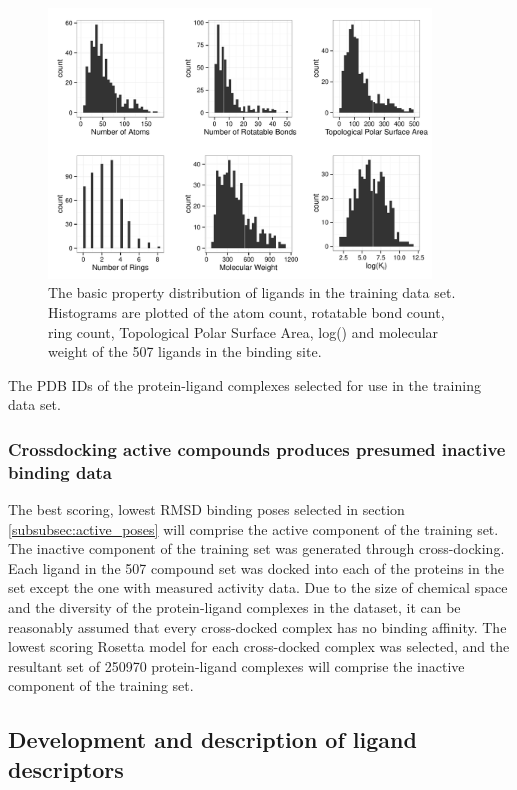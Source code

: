 \begin{figure}
\centering
\includegraphics[width=4in]{figures/hts/basic_ligand_properties.pdf}
\caption{
The basic property distribution of ligands in the training data set.  Histograms are plotted of the atom count, rotatable bond count, ring count, Topological Polar Surface Area, log(\ki) and molecular weight of the 507 ligands in the binding site. 
}
\label{fig:training_ligands}
\end{figure}
\begin{table}
\scriptsize
\renewcommand{\tabcolsep}{0.09cm}
\centering

\caption{The \acs{PDB} IDs of the protein-ligand complexes selected for use in the training data set.}
\label{table:training_pdbs}
\end{table}

\subsubsection{Crossdocking active compounds produces presumed inactive binding data}
The best scoring, lowest \ac{RMSD} binding poses selected in section \ref{subsubsec:active_poses} will comprise the active component of the training set.
The inactive component of the training set was generated through cross-docking.
Each ligand in the 507 compound set was docked into each of the proteins in the set except the one with measured activity data.
Due to the size of chemical space \citep{Reymond:2012un} and the diversity of the protein-ligand complexes in the dataset, it can be reasonably assumed that every cross-docked complex has no binding affinity.
The lowest scoring Rosetta model for each cross-docked complex was selected, and the resultant set of 250970 protein-ligand complexes will comprise the inactive component of the training set.

\subsection{Development and description of ligand descriptors}
\label{subsec:descriptor_development}
